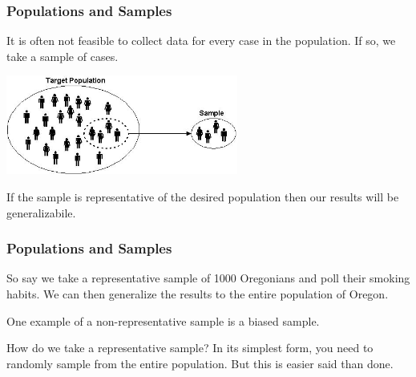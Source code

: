 \documentclass[handout]{beamer}
\newcommand{\blue}[1]{\textcolor{blue2}{#1}}
\begin{document}
\begin{frame}
\frametitle{Populations and Samples}

It is often not feasible to collect data for every case in the population.  If so, we take a \blue{sample} of cases.

\begin{center}
\pause\includegraphics[width=3in]{./figure/target-population.jpg} 
\end{center}


\pause If the sample is \blue{representative} of the desired population then our results will be \blue{generalizabile}.  

\end{frame}




\begin{frame}
\frametitle{Populations and Samples}
So say we take a representative sample of 1000 Oregonians and poll their smoking habits.  We can then generalize the results to the \blue{entire} population of Oregon.

\vspace{0.5cm}

\pause One example of a non-representative sample is a \blue{biased sample}.

\vspace{0.5cm}

\pause \blue{How do we take a representative sample}?  In its simplest form, you need to \blue{randomly} sample from the entire population.  But this is easier said than done.



\end{frame}
\end{document}
